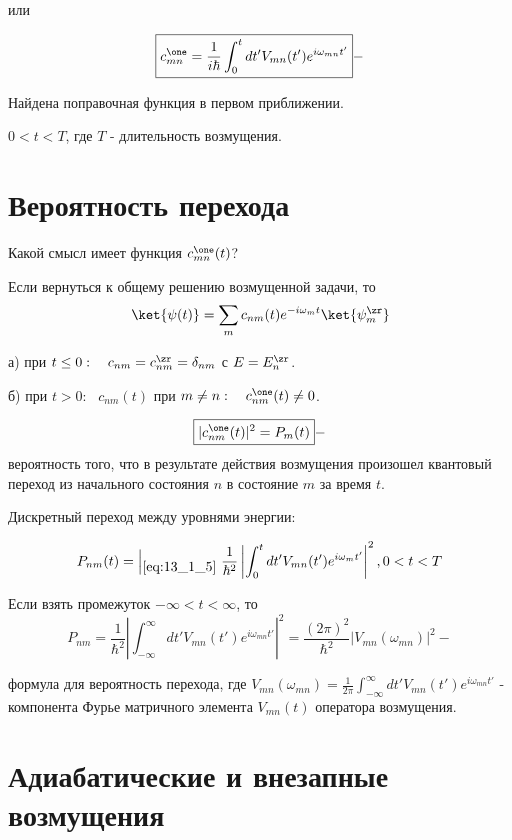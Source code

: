 или

\begin{equation*}
\boxed{c_{mn}^\one = \frac{1}{i\hbar} \int_0^t dt' V_{mn}(t') e^{i \omega_{mn} t'}} -
\end{equation*}

Найдена поправочная функция в первом приближении.

$0 < t < T$, где $T$ - длительность возмущения.

\section{Вероятность перехода}

Какой смысл имеет функция $c_{mn}^\one (t)$?

Если вернуться к общему решению возмущенной задачи, то 
$$
\ket{\psi(t)} = \sum_m c_{nm}(t) e^{-i \omega_m t} \ket{\psi_m^\zr}
$$

а) при $t \le 0: ~~~c_{nm} = c_{nm}^\zr = \delta_{nm}$ с $E=E_n^\zr$.

б) при $t > 0: ~~~c_{nm}(t)$ при $m \not = n:~~~c_{nm}^\one(t) \not = 0$.

$$
\boxed{|c_{nm}^\one (t)|^2 = P_m(t)} -
$$
вероятность того, что в результате действия возмущения произошел квантовый переход из начального состояния $n$ в состояние $m$ за время $t$.

Дискретный переход между уровнями энергии:

$$
P_{nm}(t) =\left |_{\eqref{eq:13_1_5}} \right. \frac{1}{\hbar^2} \left | \int_0^t dt' V_{mn}(t') e^{i \omega_m t'} \right |^2, 0 < t < T
$$

Если взять промежуток $-\infty < t < \infty$, то 
$$
P_{nm} = \frac{1}{\hbar^2} \left | \int_{-\infty}^\infty dt' V_{mn}(t')e^{i \omega_{mn}t'} \right |^2 = \frac{(2\pi)^2}{\hbar^2} \left | V_{mn}(\omega_{mn})\right|^2 - 
$$

формула для вероятность перехода, где $V_{mn}(\omega_{mn}) = \frac{1}{2\pi} \int_{-\infty}^\infty dt' V_{mn}(t') e^{i\omega_{mn}t'}$ - компонента Фурье матричного элемента $V_{mn}(t)$ оператора возмущения.

\section{Адиабатические и внезапные возмущения}

